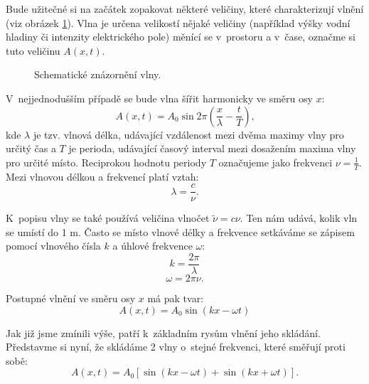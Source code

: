 Bude užitečné si na začátek zopakovat některé veličiny, které charakterizují vlnění (viz obrázek \ref{obr:Vlna}).
Vlna je určena velikostí nějaké veličiny (například výšky vodní hladiny či intenzity elektrického pole) měnící se v~prostoru a v~čase, označme si tuto veličinu $A(x,t)$. 
\begin{figure} [ht]
\centering
\caption[Komplexní rovina]{Schematické  znázornění vlny.}
\label{obr:Vlna}
\end{figure}

V~nejjednodušším případě se bude vlna šířit harmonicky ve směru osy $x$:
\begin{equation}
A(x, t) = A_0 \sin2\pi \left ( \frac{x}{\lambda}-\frac{t}{T} \right) \mbox{,}
\label{rov:Vlna}
\end{equation}
kde $\lambda$ je tzv. vlnová délka, udávající vzdálenost mezi dvěma maximy vlny pro určitý čas a $T$ je perioda, udávající časový interval mezi dosažením maxima vlny pro určité místo. Reciprokou hodnotu periody $T$ označujeme jako  frekvenci $\nu = \frac{1}{T}$. Mezi vlnovou délkou a frekvencí platí vztah:
\begin{equation}
\lambda = \frac{c}{\nu}\mbox{.}
\label{rov:Vlna2}
\end{equation}

\noindent K~popisu vlny se také používá veličina vlnočet $\tilde{\nu}=c\nu$\mbox{.} Ten nám udává, kolik vln se umístí do 1 m.
Často se místo vlnové délky a frekvence setkáváme se zápisem pomocí vlnového čísla $k$ a  úhlové frekvence $\omega$:
\begin{equation}
k = \frac{2\pi}{\lambda}\mbox{}
\label{rov:Vlna3}
\end{equation}
\begin{equation}
\omega = 2\pi\nu\mbox{.}
\label{rov:Vlna4}
\end{equation}

\noindent Postupné vlnění ve směru osy $x$ má pak tvar:
\begin{equation}
A(x,t)=A_0 \sin(kx - \omega t)
\label{rov:Vlna5}
\end{equation}

\noindent Jak již jsme zmínili výše, patří k~základním rysům vlnění jeho skládání. Představme si nyní, že skládáme 2 vlny o~stejné frekvenci, které směřují proti sobě:
\begin{equation}
A(x,t)=A_0[\sin (kx-\omega t)+ \sin (kx+\omega t)]\mbox{.}
\label{rov:Vlna6}
\end{equation}

